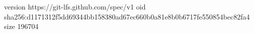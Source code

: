 version https://git-lfs.github.com/spec/v1
oid sha256:d1171312f5dd69344bb158380ad67ec660b0a81e8b0b6717fe550854bec82fa4
size 196704
